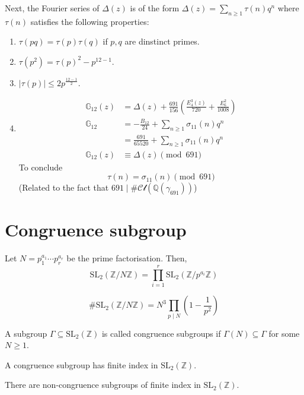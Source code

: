 \documentclass[oneside, 12pt]{scrbook}
\newcommand{\QQ}{\mathbb Q}
\newcommand{\ZZ}{\mathbb Z}
\theoremstyle{theorem}
\begin{document}
Next, the Fourier series of $\Delta(z)$ is of the form $\Delta(z) = \sum_{n \geq 1} \tau(n)q^n$ where $\tau(n)$ satisfies the following properties: 
\begin{enumerate}
\item $\tau(pq) =\tau(p)\tau(q)$ if $p,q$ are dinstinct primes. 
\item $\tau(p^2) = \tau(p)^2 - p^{12-1}$.
\item $|\tau(p)| \le 2 p^{\frac{12-1}{2}}$.
\item 
\begin{align*}
\mathbb{G}_{12}(z) &= \Delta(z) + \frac{691}{156} \left( \frac{E_{4}^3(z)}{720} + \frac{E_{6}^2}{1008} \right) \\
\mathbb{G}_{12} &= -\frac{B_{12}}{24} + \sum_{n \geq 1} \sigma_{11}(n) q^n \\
&= \frac{691}{65520} + \sum_{n \geq 1} \sigma_{11}(n) q^n \\ 
\mathbb{G}_{12}(z) &\equiv \Delta(z) \pmod{691}
\end{align*}
To conclude $$\tau(n) = \sigma_{11}(n) \pmod{691}$$
(Related to the fact that $691 \mid \# \mathcal{Cl}(\QQ(\gamma_{691}))$)
\end{enumerate}

\section{Congruence subgroup}

\begin{proposition}
Let $N=p_{1}^{a_{1}}\cdots p_{r}^{a_{r}}$ be the prime factorisation. Then, $$\mathrm{SL}_{2} (\ZZ / N \ZZ) = \prod_{i=1}^{r} \mathrm{SL}_{2}(\ZZ / p^{a_{i}} \ZZ) $$ 
\end{proposition}

\begin{lemma}
$$\# \mathrm{SL}_{2}(\ZZ / N \ZZ) = N^3 \prod_{p \mid N} \left( 1 - \frac{1}{p^2} \right)$$
\end{lemma}

\begin{definition}
A subgroup $\Gamma \subseteq \mathrm{SL}_{2}(\ZZ)$ is called congruence subgroups if $\Gamma(N) \subseteq \Gamma$ for some $N \geq 1$.
\end{definition}

\begin{lemma}
A congruence subgroup has finite index in $\mathrm{SL}_{2}(\ZZ)$.
\end{lemma}

\begin{remark}
There are non-congruence subgroups of finite index in $\mathrm{SL}_{2}(\ZZ)$.
\end{remark}
\end{document}
